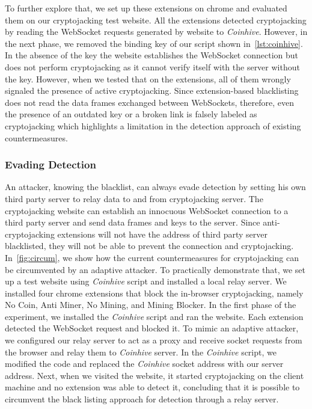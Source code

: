 \documentclass[acmlarge]{acmart}
\newcommand{\ch}{{\em Coinhive}\xspace}
\newcommand{\cj}{cryptojacking\xspace}
\begin{document}
To further explore that, we set up these extensions on chrome and evaluated them on our \cj test website. All the extensions detected \cj by reading the WebSocket requests generated by website to \ch. However, in the next phase, we removed the binding key of our script shown in~\autoref{lst:coinhive}. In the absence of the key the website establishes the WebSocket connection but does not perform \cj as it cannot verify itself with the server without the key. However, when we tested that on the extensions, all of them wrongly signaled the presence of active \cj. Since extension-based blacklisting does not read the data frames exchanged between WebSockets, therefore, even the presence of an outdated key or a broken link is falsely labeled as \cj which highlights a limitation in the detection approach of existing countermeasures. 


\subsubsection{Evading Detection} \label{sec:evadex}
An attacker, knowing the blacklist, can always evade detection by setting his own third party server to relay data to and from \cj server. The \cj website can establish an innocuous WebSocket connection to a third party server and send data frames and keys to the server. Since anti-\cj extensions will not have the address of third party server blacklisted, they will not be able to prevent the connection and \cj. In~\autoref{fig:circum}, we show how the current countermeasures for \cj can be circumvented by an adaptive attacker. To practically demonstrate that, we set up a test website using \ch script and installed a local relay server. We installed four chrome extensions that block the in-browser \cj, namely No Coin, Anti Miner, No Mining, and Mining Blocker. In the first phase of the experiment, we installed the \ch script and ran the website. Each extension detected the WebSocket request and blocked it. To mimic an adaptive attacker, we configured our relay server to act as a proxy and receive socket requests from the browser and relay them to \ch server. In the \ch script, we modified the code and replaced the \ch socket address with our server address. Next, when we visited the website, it started \cj on the client machine and no extension was able to detect it, concluding that it is possible to circumvent the black listing approach for detection through a relay server.
\end{document}
